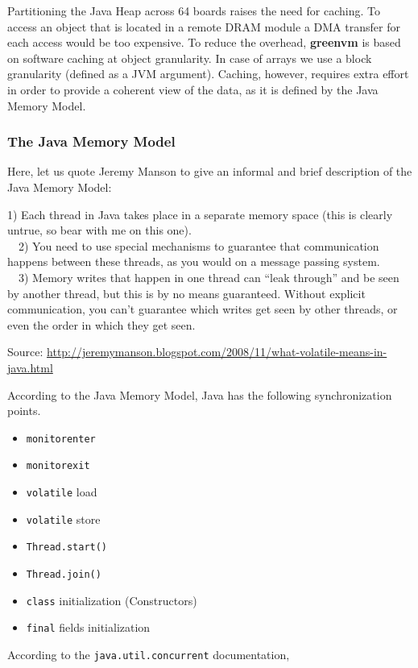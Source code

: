 \documentclass[
a4paper,
12pt,
]{report}
\newcommand{\gvm}{{\fontfamily{fco}\selectfont\textbf{\color{g}green\color{v}vm}}\xspace}
\newcommand{\java}{Java\texttrademark\xspace}
\begin{document}
Partitioning the \java Heap across 64 boards raises the need for
caching. To access an object that is located in a remote DRAM module a
DMA transfer for each access would be too expensive. To reduce the
overhead, \gvm is based on software caching at object granularity. In
case of arrays we use a block granularity (defined as a JVM argument).
Caching, however, requires extra effort in order to provide a coherent
view of the data, as it is defined by the \java Memory Model.

\subsubsection{The \java Memory Model}
Here, let us quote Jeremy Manson to give an informal and brief
description of the \java Memory Model:

\begin{quoting}
  1) Each thread in Java takes place in a separate memory space
  (this is clearly untrue, so bear with me on this one).\\
  \ ~2) You need to use special mechanisms to guarantee that
  communication happens between these threads, as you would on a
  message passing system.\\
  \ ~3) Memory writes that happen in one thread can ``leak through'' and
  be seen by another thread, but this is by no means
  guaranteed. Without explicit communication, you can't guarantee
  which writes get seen by other threads, or even the order in which
  they get seen.
\end{quoting}
Source: \url{http://jeremymanson.blogspot.com/2008/11/what-volatile-means-in-java.html}

According to the \java Memory Model, \java has the following
synchronization points.

\begin{itemize}
\item \verb!monitorenter!
\item \verb!monitorexit!
\item \verb!volatile! load
\item \verb!volatile! store
\item \verb!Thread.start()!
\item \verb!Thread.join()!
\item \verb!class! initialization (Constructors)
\item \verb!final! fields initialization
\end{itemize}

According to the \verb!java.util.concurrent! documentation,
\end{document}
